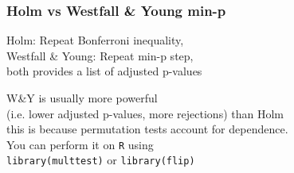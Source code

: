 \documentclass[xcolor={pdftex,dvipsnames,table}]{beamer}
\newcommand{\bb}[1]{\begin{block}{#1}}
\newcommand{\eb}{\end{block}}
\newcommand{\bi}{\begin {itemize}}
\newcommand{\ei}{\end{itemize}}
\begin{document}
\begin{frame}[fragile]
\frametitle{Holm vs Westfall \& Young min-p}
\pause
Holm: Repeat Bonferroni inequality,\\
\pause
Westfall \& Young: Repeat  min-p step,\\ 
\pause
\bigskip
both provides a list of adjusted p-values

W\&Y is usually more powerful \\ (i.e. lower adjusted p-values, more rejections) than Holm\\
\pause
\medskip
this is because permutation tests account for dependence.\\
\pause
\medskip
You can perform it on {\tt R} using \\ {\tt library(multtest)} or {\tt library(flip)}

\end{frame}








\end{document}
